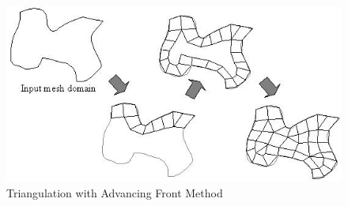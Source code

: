 \begin{figure}[H]
	\caption{Triangulation with Advancing Front Method \cite{103}}
	\centering
	\includegraphics[scale = 0.65]{advancing}
\end{figure}
